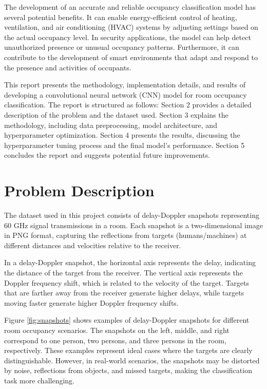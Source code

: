 \documentclass{article}
\begin{document}
The development of an accurate and reliable occupancy classification model has several potential benefits. It can enable energy-efficient control of heating, ventilation, and air conditioning (HVAC) systems by adjusting settings based on the actual occupancy level. In security applications, the model can help detect unauthorized presence or unusual occupancy patterns. Furthermore, it can contribute to the development of smart environments that adapt and respond to the presence and activities of occupants.

This report presents the methodology, implementation details, and results of developing a convolutional neural network (CNN) model for room occupancy classification. The report is structured as follows: Section 2 provides a detailed description of the problem and the dataset used. Section 3 explains the methodology, including data preprocessing, model architecture, and hyperparameter optimization. Section 4 presents the results, discussing the hyperparameter tuning process and the final model's performance. Section 5 concludes the report and suggests potential future improvements.

\section{Problem Description}
The dataset used in this project consists of delay-Doppler snapshots representing 60 GHz signal transmissions in a room. Each snapshot is a two-dimensional image in PNG format, capturing the reflections from targets (humans/machines) at different distances and velocities relative to the receiver.

In a delay-Doppler snapshot, the horizontal axis represents the delay, indicating the distance of the target from the receiver. The vertical axis represents the Doppler frequency shift, which is related to the velocity of the target. Targets that are farther away from the receiver generate higher delays, while targets moving faster generate higher Doppler frequency shifts.

Figure \ref{fig:snapshots} shows examples of delay-Doppler snapshots for different room occupancy scenarios. The snapshots on the left, middle, and right correspond to one person, two persons, and three persons in the room, respectively. These examples represent ideal cases where the targets are clearly distinguishable. However, in real-world scenarios, the snapshots may be distorted by noise, reflections from objects, and missed targets, making the classification task more challenging.
\end{document}
